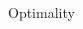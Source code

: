 \documentclass[final]{beamer}
\newcommand {\bxi} {\mbox{\boldmath $\xi$}}%
\begin{document}
\begin{frame}{}
{\begin{columns}[t]
\begin{column}{.30\linewidth}
\begin{block}{\centering Optimality}
%

\end{block}

 \end{column}
        
\begin{column}{.30\linewidth}


\end{column}
\end{columns}}
\end{frame}
\end{document}
